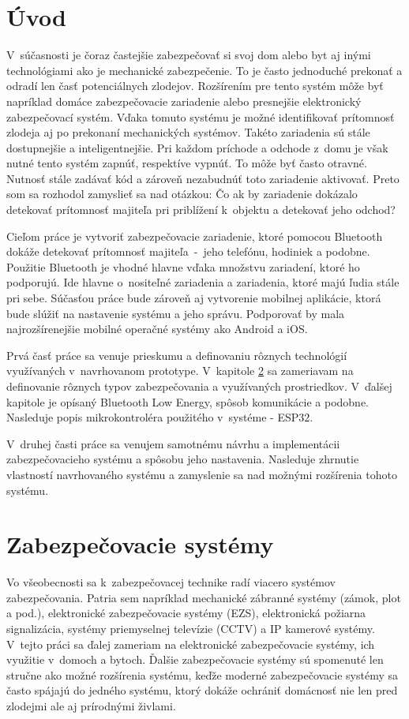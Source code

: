 \chapter{Úvod}

V~súčasnosti je čoraz častejšie zabezpečovať si svoj dom alebo byt aj inými technológiami ako je mechanické zabezpečenie. To je často jednoduché prekonať a odradí len časť potenciálnych zlodejov. Rozšírením pre tento systém môže byť napríklad domáce zabezpečovacie zariadenie alebo presnejšie elektronický zabezpečovací systém. Vďaka tomuto systému je možné identifikovať prítomnosť zlodeja aj po prekonaní mechanických systémov. Takéto zariadenia sú stále dostupnejšie a inteligentnejšie. Pri každom príchode a odchode z~domu je však nutné tento systém zapnúť, respektíve vypnúť. To môže byť často otravné. Nutnosť stále zadávať kód a zároveň nezabudnúť toto zariadenie aktivovať. Preto som sa rozhodol zamyslieť sa nad otázkou: Čo ak by zariadenie dokázalo detekovať prítomnosť majiteľa pri priblížení k~objektu a detekovať jeho odchod?

Cieľom práce je vytvoriť zabezpečovacie zariadenie, ktoré pomocou Bluetooth dokáže detekovať prítomnosť majiteľa~-~jeho telefónu, hodiniek a podobne. Použitie Bluetooth je vhodné hlavne vďaka množstvu zariadení, ktoré ho podporujú. Ide hlavne o~nositeľné zariadenia a zariadenia, ktoré majú ľudia stále pri sebe.
Súčasťou práce bude zároveň aj vytvorenie mobilnej aplikácie, ktorá bude slúžiť na nastavenie systému a jeho správu. Podporovať by mala najrozšírenejšie mobilné operačné systémy ako Android a iOS.

Prvá časť práce sa venuje prieskumu a definovaniu rôznych technológií využívaných v~navrhovanom prototype. V~kapitole \ref{chap:ZS} sa zameriavam na definovanie rôznych typov zabezpečovania a využívaných prostriedkov. V~ďalšej kapitole je opísaný Bluetooth Low Energy, spôsob komunikácie a podobne. Nasleduje popis mikrokontroléra použitého v~systéme - ESP32. 

V~druhej časti práce sa venujem samotnému návrhu a implementácii zabezpečovacieho systému a spôsobu jeho nastavenia. Nasleduje zhrnutie vlastností navrhovaného systému a zamyslenie sa nad možnými rozšírenia tohoto systému.

\chapter{Zabezpečovacie systémy}\label{chap:ZS}

Vo všeobecnosti sa k~zabezpečovacej technike radí viacero systémov zabezpečovania. Patria sem napríklad mechanické zábranné systémy (zámok, plot a pod.), elektronické zabezpečovacie systémy (EZS), elektronická požiarna signalizácia, systémy priemyselnej televízie (CCTV) a IP kamerové systémy. V~tejto práci sa ďalej zameriam na elektronické zabezpečovacie systémy, ich využitie v~domoch a bytoch. Ďalšie zabezpečovacie systémy sú spomenuté len stručne ako možné rozšírenia systému, keďže moderné zabezpečovacie systémy sa často spájajú do jedného systému, ktorý dokáže ochrániť domácnosť nie len pred zlodejmi ale aj prírodnými živlami.

